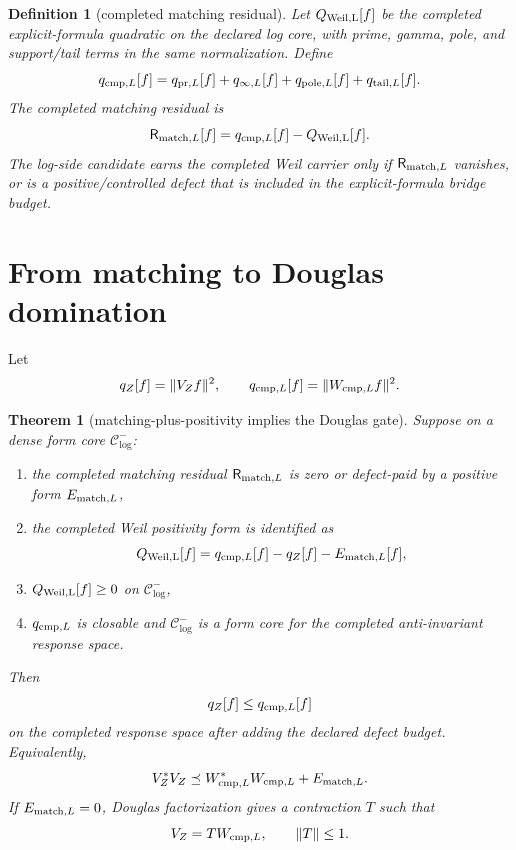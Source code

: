 \documentclass[11pt]{article}
\newtheorem{theorem}{Theorem}
\newtheorem{definition}{Definition}
\newcommand{\R}{\mathsf R}
\newcommand{\Ccore}{\mathcal C^-_{\log}}
\begin{document}
\begin{definition}[completed matching residual]
Let \(Q_{\rm Weil,L}[f]\) be the completed explicit-formula quadratic on the declared log core, with prime, gamma, pole, and support/tail terms in the same normalization.  Define
\[
  q_{{\rm cmp},L}[f]
  =q_{{\rm pr},L}[f]+q_{\infty,L}[f]+q_{{\rm pole},L}[f]+q_{{\rm tail},L}[f].
\]
The completed matching residual is
\[
  \R_{{\rm match},L}[f]=q_{{\rm cmp},L}[f]-Q_{\rm Weil,L}[f].
\]
The log-side candidate earns the completed Weil carrier only if \(\R_{{\rm match},L}\) vanishes, or is a positive/controlled defect that is included in the explicit-formula bridge budget.
\end{definition}

\section{From matching to Douglas domination}
Let
\[
  q_Z[f]=\|V_Zf\|^2,
  \qquad
  q_{{\rm cmp},L}[f]=\|W_{{\rm cmp},L}f\|^2.
\]

\begin{theorem}[matching-plus-positivity implies the Douglas gate]
Suppose on a dense form core \(\Ccore\):
\begin{enumerate}[label=(\roman*)]
  \item the completed matching residual \(\R_{{\rm match},L}\) is zero or defect-paid by a positive form \(E_{{\rm match},L}\),
  \item the completed Weil positivity form is identified as
  \[
    Q_{\rm Weil,L}[f]=q_{{\rm cmp},L}[f]-q_Z[f]-E_{{\rm match},L}[f],
  \]
  \item \(Q_{\rm Weil,L}[f]\ge0\) on \(\Ccore\),
  \item \(q_{{\rm cmp},L}\) is closable and \(\Ccore\) is a form core for the completed anti-invariant response space.
\end{enumerate}
Then
\[
  q_Z[f]\le q_{{\rm cmp},L}[f]
\]
on the completed response space after adding the declared defect budget.  Equivalently,
\[
  V_Z^*V_Z\preceq W_{{\rm cmp},L}^*W_{{\rm cmp},L}+E_{{\rm match},L}.
\]
If \(E_{{\rm match},L}=0\), Douglas factorization gives a contraction \(T\) such that
\[
  V_Z=T W_{{\rm cmp},L},\qquad \|T\|\le1.
\]
\end{theorem}
\end{document}
